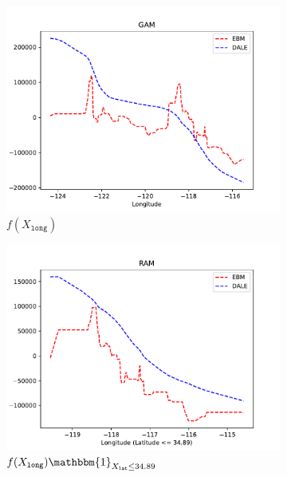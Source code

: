 \documentclass[12pt]{article}
\newcommand{\when}[1]{\mathbbm{1}_{#1}}
\begin{document}
\begin{figure}[htbp]
    \centering
    \begin{subfigure}{0.32\textwidth}
        \centering
        \includegraphics[width=\textwidth]{figures/california_gam}
        \caption{\(f(X_{\mathtt{long}})\)}
        \label{subfig:california_gam}
    \end{subfigure}
    \begin{subfigure}{0.32\textwidth}
        \centering
        \includegraphics[width=\textwidth]{figures/california_ram_1}
        \caption{\(f(X_{\mathtt{long}}) \when{X_{\mathtt{lat}} \leq 34.89}\)}
        \label{subfig:california_ram_1}
    \end{subfigure}
    \begin{subfigure}{0.32\textwidth}

\end{subfigure}
\end{figure}
\end{document}
